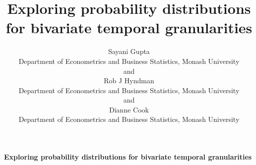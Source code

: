 \documentclass[12pt]{article}
\newcommand{\blind}{}
\begin{document}
\def\spacingset#1{\renewcommand{\baselinestretch}%
{#1}\small\normalsize} \spacingset{1}



\blind
{
  \title{\bf Exploring probability distributions for bivariate temporal granularities}

  \author{
        Sayani Gupta \\
    Department of Econometrics and Business Statistics, Monash University\\
     and \\     Rob J Hyndman \\
    Department of Econometrics and Business Statistics, Monash University\\
     and \\     Dianne Cook \\
    Department of Econometrics and Business Statistics, Monash University\\
      }
  \maketitle
} \fi

\blind
{
  \bigskip
  \bigskip
  \bigskip
  \begin{center}
    {\LARGE\bf Exploring probability distributions for bivariate temporal granularities}
  \end{center}
  \medskip
} \fi
\end{document}
